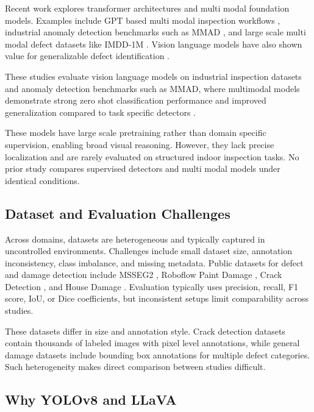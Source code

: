 Recent work explores transformer architectures and multi modal foundation models. Examples include GPT based multi modal inspection workflows \cite{wen_autonomous_2024}, industrial anomaly detection benchmarks such as MMAD \cite{jiang_mmad_2025}, and large scale multi modal defect datasets like IMDD-1M \cite{chen_preference_2025}. Vision language models have also shown value for generalizable defect identification \cite{malla_enhancing_2025}.

These studies evaluate vision language models on industrial inspection datasets and anomaly detection benchmarks such as MMAD, where multimodal models demonstrate strong zero shot classification performance and improved generalization compared to task specific detectors \cite{jiang_mmad_2025}.

These models have large scale pretraining rather than domain specific supervision, enabling broad visual reasoning. However, they lack precise localization and are rarely evaluated on structured indoor inspection tasks. No prior study compares supervised detectors and multi modal models under identical conditions.

\subsection{Dataset and Evaluation Challenges}

Across domains, datasets are heterogeneous and typically captured in uncontrolled environments. Challenges include small dataset size, annotation inconsistency, class imbalance, and missing metadata. Public datasets for defect and damage detection include MSSEG2 \cite{noauthor_data_nodate}, Roboflow Paint Damage \cite{hkust_paint_nodate}, Crack Detection \cite{noauthor_crack_nodate}, and House Damage \cite{noauthor_house_nodate}. Evaluation typically uses precision, recall, F1 score, IoU, or Dice coefficients, but inconsistent setups limit comparability across studies.

These datasets differ in size and annotation style. Crack detection datasets contain thousands of labeled images with pixel level annotations, while general damage datasets include bounding box annotations for multiple defect categories. Such heterogeneity makes direct comparison between studies difficult.

\subsection{Why YOLOv8 and LLaVA}

